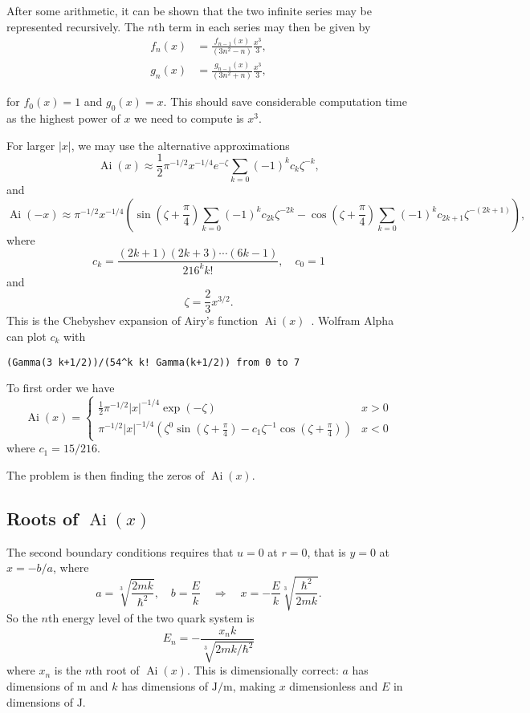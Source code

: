 \documentclass[]{article}
\renewcommand{\mod}[1]{\ensuremath{\lvert {#1} \rvert}}
\newcommand{\Ai}[1]{\ensuremath{\operatorname{Ai}({#1})}}
\begin{document}
After some arithmetic, it can be shown that the two infinite series may be represented recursively. The $n$th term in each series may then be given by
\begin{align*}
f_{n}(x) &= \frac{f_{n-1}(x)}{(3n^{2} - n)} \frac{x^{3}}{3},\\ 
g_{n}(x) &= \frac{g_{n-1}(x)}{(3n^{2} + n)} \frac{x^{3}}{3},
\end{align*}

for $f_{0}(x) = 1$ and $g_{0}(x) = x$. This should save considerable computation time as the highest power of $x$ we need to compute is $x^{3}$.

For larger $\mod{x}$, we may use the alternative approximations
\[
\Ai{x} \approx \frac{1}{2}\pi^{-1/2}x^{-1/4}e^{-\zeta} \sum\limits_{k=0} (-1)^{k}c_{k}\zeta^{-k},
\]
and
\[
\Ai{-x} \approx \pi^{-1/2}x^{-1/4}\left (
	\sin{(\zeta + \frac{\pi}{4})}\sum\limits_{k=0}(-1)^{k}c_{2k}\zeta^{-2k} -
	\cos{(\zeta + \frac{\pi}{4})}\sum\limits_{k=0}(-1)^{k}c_{2k+1}\zeta^{-(2k+1)}
\right ),
\]
where
\[
c_{k} = \frac{(2k+1)(2k+3)\dotsb(6k-1)}{216^{k}k!}, \quad c_{0} = 1
\]
and
\[
\zeta = \frac{2}{3}x^{3/2}.
\]
This is the Chebyshev expansion of Airy's function $\Ai{x}$~\cite{ref:agil}. Wolfram Alpha can plot $c_{k}$ with
\begin{verbatim}
(Gamma(3 k+1/2))/(54^k k! Gamma(k+1/2)) from 0 to 7
\end{verbatim}

To first order we have
\[
\Ai{x} = \begin{cases}
	\frac{1}{2}\pi^{-1/2}\mod{x}^{-1/4}\exp{(-\zeta)} & x > 0\\
	\pi^{-1/2}\mod{x}^{-1/4} \left (
		\zeta^{0}\sin{(\zeta + \frac{\pi}{4})} - c_{1}\zeta^{-1}\cos{(\zeta + \frac{\pi}{4})}
	\right ) & x < 0
\end{cases}
\]
where $c_{1} = 15/216$.

The problem is then finding the zeros of $\Ai{x}$.

\subsection{Roots of $\Ai{x}$}

The second boundary conditions requires that $u = 0$ at $r = 0$, that is $y = 0$ at $x = -b/a$, where
\[
a = \sqrt[3]{\frac{2mk}{\hbar^{2}}},\quad b = \frac{E}{k}
\quad\Rightarrow\quad x = -\frac{E}{k}\sqrt[3]{\frac{\hbar^{2}}{2mk}}.
\]
So the $n$th energy level of the two quark system is $$E_{n} = -\frac{x_{n}k}{\sqrt[3]{2mk/\hbar^{2}}}$$ where $x_{n}$ is the $n$th root of $\Ai{x}$. This is dimensionally correct: $a$ has dimensions of $\si{\metre}$ and $k$ has dimensions of $\si{\joule\per\metre}$, making $x$ dimensionless and $E$ in dimensions of $\si{\joule}$.
\end{document}
